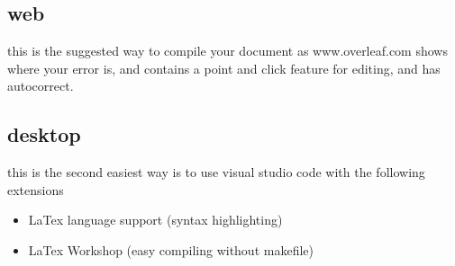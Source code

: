 \subsection{web}
this is the suggested way to compile your document as www.overleaf.com shows where your error is,
and contains a point and click feature for editing, and has autocorrect.
\subsection{desktop}
this is the second easiest way is to use visual studio code with the following extensions
\begin{itemize}
	\item LaTex language support (syntax highlighting)
	\item LaTex Workshop (easy compiling without makefile)
\end{itemize}

